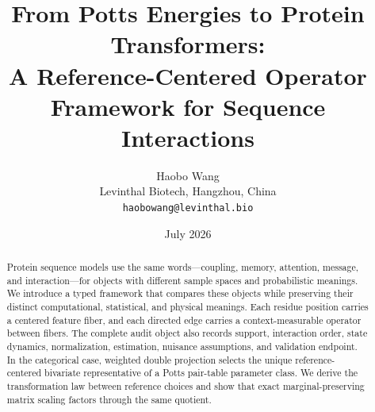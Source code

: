 \documentclass[10pt]{article}
\title{From Potts Energies to Protein Transformers:\\
A Reference-Centered Operator Framework for Sequence Interactions}
\author{Haobo Wang\\
\small Levinthal Biotech, Hangzhou, China\\
\small\texttt{haobowang@levinthal.bio}}
\date{July 2026}
\theoremstyle{definition}
\theoremstyle{remark}
\begin{document}
\maketitle

\begin{abstract}
Protein sequence models use the same words---coupling, memory, attention, message, and
interaction---for objects with different sample spaces and probabilistic meanings.  We introduce a
typed framework that compares these objects while preserving their distinct computational,
statistical, and physical meanings.  Each residue position carries a centered feature fiber, and
each directed edge carries a context-measurable operator between fibers.  The complete audit object
also records support, interaction order, state dynamics, normalization, estimation, nuisance
assumptions, and validation endpoint.  In the categorical case, weighted double projection selects
the unique reference-centered bivariate representative of a Potts pair-table parameter class.  We
derive the transformation law between reference choices and show that exact marginal-preserving
matrix scaling factors through the same quotient.


\end{abstract}
\end{document}
